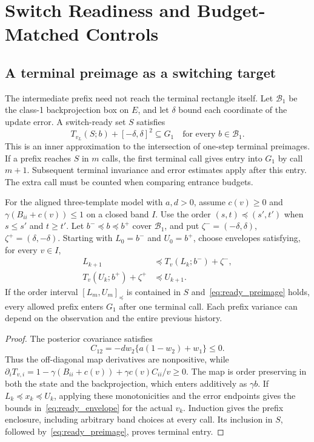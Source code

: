 \section{Switch Readiness and Budget-Matched Controls}
\label{sec:switch_ready}

\subsection{A terminal preimage as a switching target}
The intermediate prefix need not reach the terminal rectangle itself.
Let $\mathcal B_1$ be the class-1 backprojection box on $E$, and let
$\delta$ bound each coordinate of the update error.
A switch-ready set $S$ satisfies
\begin{equation}\label{eq:ready_preimage}
 T_{v_L}(S;b)+[-\delta,\delta]^2\subseteq G_1
 \quad\text{for every }b\in\mathcal B_1.
\end{equation}
This is an inner approximation to the intersection of one-step
terminal preimages. If a prefix reaches $S$ in $m$ calls, the first
terminal call gives entry into $G_1$ by call $m+1$. Subsequent
terminal invariance and error estimates apply after this entry.
The extra call must be counted when comparing entrance budgets.

\begin{proposition}
\label{prop:ready_envelope}
For the aligned three-template model with $a,d>0$, assume
$c(v)\ge0$ and $\gamma(B_{ii}+c(v))\le1$ on a closed band $I$.
Use the order
$(s,t)\preceq(s',t')$ when $s\le s'$ and $t\ge t'$.
Let $b^-\preceq b\preceq b^+$ cover $\mathcal B_1$, and put
$\zeta^-=(-\delta,\delta)$, $\zeta^+=(\delta,-\delta)$.
Starting with $L_0=b^-$ and $U_0=b^+$, choose envelopes satisfying,
for every $v\in I$,
\begin{align}
 L_{k+1}&\preceq T_v(L_k;b^-)+\zeta^-,\nonumber\\
 T_v(U_k;b^+)+\zeta^+&\preceq U_{k+1}.\label{eq:ready_envelope}
\end{align}
If the order interval $[L_m,U_m]_{\preceq}$ is contained in $S$
and~\eqref{eq:ready_preimage} holds, every allowed prefix enters
$G_1$ after one terminal call. Each prefix variance can depend on
the observation and the entire previous history.
\end{proposition}
\begin{proof}
The posterior covariance satisfies
\[
 C_{12}=-d w_2\{a(1-w_2)+w_1\}\le0.
\]
Thus the off-diagonal map derivatives are nonpositive, while
$\partial_iT_{v,i}=1-\gamma(B_{ii}+c(v))+\gamma c(v)C_{ii}/v\ge0$.
The map is order preserving in both the state and the
backprojection, which enters additively as $\gamma b$.
If $L_k\preceq x_k\preceq U_k$, applying these monotonicities
and the error endpoints gives the bounds in~\eqref{eq:ready_envelope}
for the actual $v_k$. Induction gives the prefix enclosure,
including arbitrary band choices at every call. Its inclusion in
$S$, followed by~\eqref{eq:ready_preimage}, proves terminal entry.
\end{proof}

